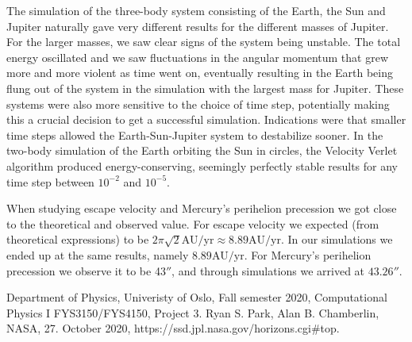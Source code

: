 \documentclass[reprint, english,notitlepage,nofootinbib]{revtex4-1}  %
\begin{document}
The simulation of the three-body system consisting of the Earth, the Sun and Jupiter naturally gave very different results for the different masses of Jupiter. For the larger masses, we saw clear signs of the system being unstable. The total energy oscillated and we saw fluctuations in the angular momentum that grew more and more violent as time went on, eventually resulting in the Earth being flung out of the system in the simulation with the largest mass for Jupiter. These systems were also more sensitive to the choice of time step, potentially making this a crucial decision to get a successful simulation. Indications were that smaller time steps allowed the Earth-Sun-Jupiter system to destabilize sooner. In the two-body simulation of the Earth orbiting the Sun in circles, the Velocity Verlet algorithm produced energy-conserving, seemingly perfectly stable results for any time step between $10^{-2}$ and $10^{-5}$.

When studying escape velocity and Mercury's perihelion precession we got close to the theoretical and observed value. For escape velocity we expected (from theoretical expressions) to be $2\pi\sqrt{2}\text{AU/yr} \approx 8.89\text{AU/yr}$. In our simulations we ended up at the same results, namely $8.89\text{AU/yr}$. For Mercury's perihelion precession we observe it to be 43$''$, and through simulations we arrived at $43.26''$.



\onecolumngrid
\vspace{1cm} %
\newpage

\begin{thebibliography}{}
 Department of Physics, Univeristy of Oslo, Fall semester 2020, Computational Physics I FYS3150/FYS4150, Project 3.
 Ryan S. Park, Alan B. Chamberlin, NASA, 27. October 2020, https://ssd.jpl.nasa.gov/horizons.cgi\#top.

\end{thebibliography}
\end{document}
